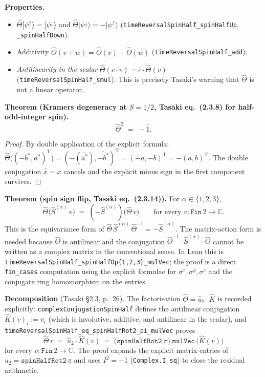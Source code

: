 \documentclass[a4paper,11pt]{article}
\begin{document}
\noindent\textbf{Properties.}
\begin{itemize}
\item \(\hat{\Theta}|\psi^{\uparrow}\rangle = |\psi^{\downarrow}\rangle\)
and \(\hat{\Theta}|\psi^{\downarrow}\rangle = -|\psi^{\uparrow}\rangle\)
(\texttt{timeReversalSpinHalf\_spinHalfUp},
\texttt{\_spinHalfDown}).
\item Additivity \(\hat{\Theta}(v + w) = \hat{\Theta}(v) + \hat{\Theta}(w)\)
(\texttt{timeReversalSpinHalf\_add}).
\item \emph{Antilinearity in the scalar}
\(\hat{\Theta}(c \cdot v) = \overline{c} \cdot \hat{\Theta}(v)\)
(\texttt{timeReversalSpinHalf\_smul}). This is precisely Tasaki's
warning that \(\hat{\Theta}\) is not a linear operator.
\end{itemize}

\noindent\textbf{Theorem (Kramers degeneracy at \(S = 1/2\),
Tasaki eq.~(2.3.8) for half-odd-integer spin).}
\[
  \hat{\Theta}^{2} \;=\; -\hat{1}.
\]
\begin{proof}
By double application of the explicit formula:
\(
  \hat{\Theta}\!\bigl((-b^{*}, a^{*})^{\mathrm T}\bigr)
  = (-(\overline{a^{*}}), \overline{-b^{*}})^{\mathrm T}
  = (-a, -b)^{\mathrm T}
  = -(a, b)^{\mathrm T}.
\)
The double conjugation \(\overline{\overline{x}} = x\) cancels and
the explicit minus sign in the first component survives.
\end{proof}

\noindent\textbf{Theorem (spin sign flip,
Tasaki eq.~(2.3.14)).} For \(\alpha \in \{1, 2, 3\}\),
\[
  \hat{\Theta}\bigl(\hat{S}^{(\alpha)}\,v\bigr)
  \;=\; (-\hat{S}^{(\alpha)})\bigl(\hat{\Theta}\,v\bigr)
  \qquad \text{for every } v : \texttt{Fin}\,2 \to \mathbb{C}.
\]
This is the equivariance form of
\(\hat{\Theta}\,\hat{S}^{(\alpha)}\,\hat{\Theta}^{-1}
   = -\hat{S}^{(\alpha)}\).
The matrix-action form is needed because \(\hat{\Theta}\) is
antilinear and the conjugation
\(\hat{\Theta}^{-1} \cdot \hat{S}^{(\alpha)} \cdot \hat{\Theta}\)
cannot be written as a complex matrix in the conventional sense.
In Lean this is \texttt{timeReversalSpinHalf\_spinHalfOp\{1,2,3\}\_mulVec};
the proof is a direct \texttt{fin\_cases} computation using the
explicit formulae for \(\sigma^{x}, \sigma^{y}, \sigma^{z}\) and
the conjugate ring homomorphism on the entries.

\noindent\textbf{Decomposition} (Tasaki §2.3, p.~26).
The factorisation \(\hat{\Theta} = \hat{u}_2 \cdot \hat{K}\) is
recorded explicitly: \texttt{complexConjugationSpinHalf} defines
the antilinear conjugation
\(\hat{K}(v)_i := \overline{v_i}\) (which is involutive,
additive, and antilinear in the scalar), and
\texttt{timeReversalSpinHalf\_eq\_spinHalfRot2\_pi\_mulVec}
proves
\[
  \hat{\Theta}\,v
  \;=\;
  \hat{u}_2 \cdot \hat{K}(v)
  \;=\;
  \bigl(\texttt{spinHalfRot2}\ \pi\bigr).\texttt{mulVec}\,
    \bigl(\hat{K}(v)\bigr)
\]
for every \(v : \texttt{Fin}\,2 \to \mathbb{C}\). The proof
expands the explicit matrix entries of
\(\hat{u}_2 = \texttt{spinHalfRot2}\,\pi\) and uses
\(I^{2} = -1\) (\texttt{Complex.I\_sq}) to close the residual
arithmetic.
\end{document}
